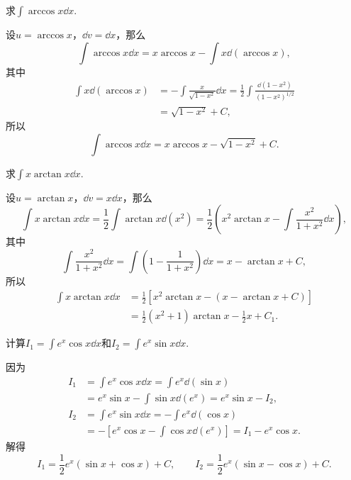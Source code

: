 \begin{example}
求\(\int \arccos x \dd{x}\).
\begin{solution}
设\(u = \arccos x\)，\(\dd{v} = \dd{x}\)，那么\[
\int \arccos x \dd{x} = x \arccos x - \int x \dd(\arccos x),
\]其中\begin{align*}
\int x \dd(\arccos x)
&= -\int \frac{x}{\sqrt{1-x^2}} \dd{x}
= \frac{1}{2} \int \frac{\dd(1-x^2)}{(1-x^2)^{1/2}} \\
&= \sqrt{1-x^2} + C,
\end{align*}所以\[
\int \arccos x \dd{x} = x \arccos x - \sqrt{1-x^2} + C.
\]
\end{solution}
\end{example}

\begin{example}
求\(\int x \arctan x \dd{x}\).
\begin{solution}
设\(u = \arctan x\)，\(\dd{v} = x \dd{x}\)，那么\[
\int x \arctan x \dd{x}
= \frac{1}{2} \int \arctan x \dd(x^2)
= \frac{1}{2} \left( x^2 \arctan x
	- \int \frac{x^2}{1+x^2} \dd{x} \right),
\]其中\[
\int \frac{x^2}{1+x^2} \dd{x}
= \int \left(1-\frac{1}{1+x^2}\right) \dd{x}
= x - \arctan x + C,
\]所以\begin{align*}
\int x \arctan x \dd{x}
&= \frac{1}{2} \left[ x^2 \arctan x
	- (x - \arctan x + C) \right] \\
&= \frac{1}{2} (x^2+1) \arctan x - \frac{1}{2} x + C_1.
\end{align*}
\end{solution}
\end{example}

\begin{example}
计算\(I_1 = \int e^x \cos x\dd{x}\)和\(I_2 = \int e^x \sin x\dd{x}\).
\begin{solution}
因为\begin{align*}
I_1 &= \int e^x \cos x\dd{x}
= \int e^x \dd(\sin x) \\
&= e^x \sin x - \int \sin x \dd(e^x)
= e^x \sin x - I_2, \\
I_2 &= \int e^x \sin x\dd{x}
= -\int e^x \dd(\cos x) \\
&= -\left[ e^x \cos x - \int \cos x \dd(e^x) \right]
= I_1 - e^x \cos x.
\end{align*}解得\[
I_1 = \frac{1}{2} e^x (\sin x + \cos x) + C,
\qquad
I_2 = \frac{1}{2} e^x (\sin x - \cos x) + C.
\]
\end{solution}
\end{example}

